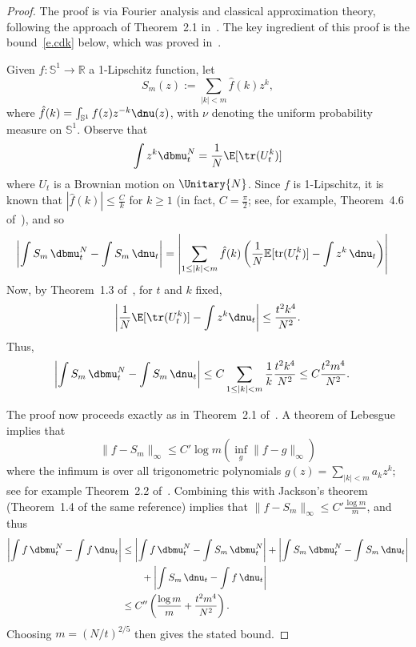 \begin{proof}
The proof is via Fourier analysis and classical approximation theory, following the approach of Theorem~2.1 in~\cite{MM-PTRF-2013}. The key ingredient of this proof is the bound~\eqref{e.cdk} below, which was proved in~\cite{CDK2016}.

Given $f:\mathbb{S}^1\rightarrow\mathbb{R}$ a 1-Lipschitz function, let
\[
S_m(z) := \sum_{|k|<m} \hat{f}(k)z^{k},
\]
where $\hat{f}(k)=\int_{\mathbb{S}^1}f(z)z^{-k}\dnu(z)$, with $\nu$ denoting the uniform probability measure on $\mathbb{S}^1$. Observe that
\[
\int z^k\dbmu^N_t=\frac{1}{N}\E[\tr(U_t^k)]
\]
where $U_t$ is a Brownian motion on $\Unitary{N}$. Since $f$ is 1-Lipschitz, it is known that $|\hat{f}(k)|\le \frac{C}{k}$ for $k\ge 1$ (in fact, $C=\frac{\pi}{2}$; see, for example, Theorem~4.6 of~\cite{Katznelson2004}), and so
\begin{align*}
\left|\int S_m\,\dbmu^N_t -\int S_m\,\dnu_t\right| &= \left|\sum_{1\le|k|<m} \hat{f}(k)
\left(\frac{1}{N}\mathbb{E}[\mathrm{tr} (U_t^k)] - \int z^k\,\dnu_t\right) \right|
\end{align*}
Now, by Theorem~1.3 of~\cite{CDK2016}, for $t$ and $k$ fixed,
\begin{equation}\label{e.cdk}
\left|\frac{1}{N}\E[\tr(U_t^k)]-\int z^k\dnu_t\right|\le\frac{t^2k^4}{N^2}.
\end{equation}
Thus,
\begin{align*}
\left|\int S_m\,\dbmu^N_t -\int S_m\,\dnu_t\right| &\le C\sum_{1\le|k|<m}\frac{1}{k}\frac{t^2k^4}{N^2}
\le C\frac{t^2m^4}{N^2}.
\end{align*}

The proof now proceeds exactly as in Theorem~2.1 of~\cite{MM-PTRF-2013}. A theorem of Lebesgue implies that
\[
\|f-S_m\|_\infty \le C'\log m\left(\inf_g \|f-g\|_\infty\right)
\]
where the infimum is over all trigonometric polynomials $g(z)=\sum_{|k|<m}a_kz^k$; see for example Theorem~2.2 of~\cite{Rivlin1981}. Combining this with Jackson's theorem (Theorem~1.4 of the same reference) implies that $\|f-S_m\|_\infty\le C'\frac{\log m}{m}$, and thus
\begin{align*}
\left|\int f\,\dbmu^N_t-\int f\,\dnu_t\right| &\le \left|\int f\,\dbmu^N_t-\int S_m\,\dbmu^N_t\right| + \left|\int S_m\,\dbmu^N_t-\int S_m\,\dnu_t\right| \\
& \qquad + \left|\int S_m\,\dnu_t-\int f\,\dnu_t\right|\\
&\le C''\left(\frac{\log m}{m} + \frac{t^2m^4}{N^2}\right).
\end{align*}
Choosing $m=(N/t)^{2/5}$ then gives the stated bound.
\end{proof}

